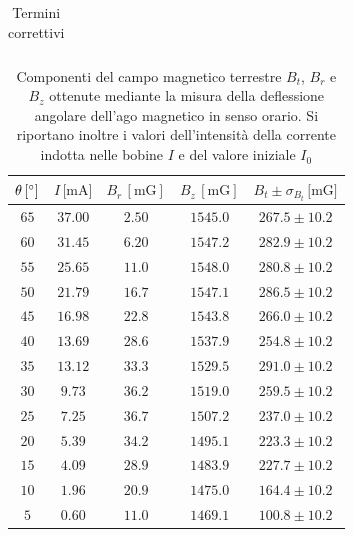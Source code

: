 \documentclass[]{article}
\begin{document}
\begin{table}[H]
\begin{tabular}{||c|c||}
\end{tabular}
\caption{Termini correttivi}
\label{termine_correttivo}
\end{table}


\begin{table}[H]
    \centering


\begin{tabular}{||c|c|c|c|c||}
    \hline
    $\theta\, [\text{\degree}] $ & $I\, \text{[mA]} $ & $B_r\, [\text{mG}] $ & $B_z\, [\text{mG}] $ & $B_t \pm \sigma_{B_t}\, \text{[mG]} $\\
    \hline\hline

    $65$ & $37.00$ & $2.50$ & $1545.0$ & $267.5 \pm 10.2$ \\\hline
    $60$ & $31.45$ & $6.20$ & $1547.2$ & $282.9 \pm 10.2$ \\\hline
    $55$ & $25.65$ & $11.0$ & $1548.0$ & $280.8 \pm 10.2$ \\\hline
    $50$ & $21.79$ & $16.7$ & $1547.1$ & $286.5 \pm 10.2$ \\\hline
    $45$ & $16.98$ & $22.8$ & $1543.8$ & $266.0 \pm 10.2$ \\\hline
    $40$ & $13.69$ & $28.6$ & $1537.9$ & $254.8 \pm 10.2$ \\\hline
    $35$ & $13.12$ & $33.3$ & $1529.5$ & $291.0 \pm 10.2$ \\\hline
    $30$ & $ 9.73$ & $36.2$ & $1519.0$ & $259.5 \pm 10.2$ \\\hline
    $25$ & $ 7.25$ & $36.7$ & $1507.2$ & $237.0 \pm 10.2$ \\\hline
    $20$ & $ 5.39$ & $34.2$ & $1495.1$ & $223.3 \pm 10.2$ \\\hline
    $15$ & $ 4.09$ & $28.9$ & $1483.9$ & $227.7 \pm 10.2$ \\\hline
    $10$ & $ 1.96$ & $20.9$ & $1475.0$ & $164.4 \pm 10.2$ \\\hline
    $5 $ & $ 0.60$ & $11.0$ & $1469.1$ & $100.8 \pm 10.2$ \\\hline

\end{tabular}
\caption{Componenti del campo magnetico terrestre $B_t$, $B_r$ e $B_z$ ottenute mediante la misura della deflessione angolare dell'ago magnetico in senso orario. Si riportano inoltre i valori dell'intensità della corrente indotta nelle bobine $I$ e del valore iniziale $I_0$}
\label{campomagneticoterrestre_sensoorario}
\end{table}
\end{document}
